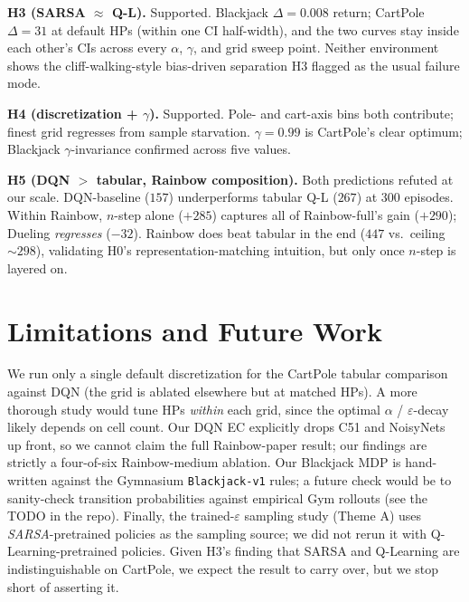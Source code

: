 \documentclass[conference]{IEEEtran}
\begin{document}
\textbf{H3 (SARSA $\approx$ Q-L).} Supported. Blackjack
$\Delta = 0.008$ return; CartPole $\Delta = 31$ at default HPs
(within one CI half-width), and the two curves stay inside each
other's CIs across every $\alpha$, $\gamma$, and grid sweep
point. Neither environment shows the cliff-walking-style
bias-driven separation H3 flagged as the usual failure mode.

\textbf{H4 (discretization + $\gamma$).} Supported. Pole- and
cart-axis bins both contribute; finest grid regresses from
sample starvation. $\gamma = 0.99$ is CartPole's clear
optimum; Blackjack $\gamma$-invariance confirmed across five
values.

\textbf{H5 (DQN $>$ tabular, Rainbow composition).} Both
predictions refuted at our scale. DQN-baseline ($157$)
underperforms tabular Q-L ($267$) at 300 episodes. Within Rainbow,
$n$-step alone ($+285$) captures all of Rainbow-full's gain
($+290$); Dueling \emph{regresses} ($-32$). Rainbow does beat
tabular in the end ($447$ vs.\ ceiling $\sim 298$), validating
H0's representation-matching intuition, but only once $n$-step
is layered on.


\section{Limitations and Future Work}

We run only a single default discretization for the CartPole tabular
comparison against DQN (the grid is ablated elsewhere but at matched
HPs). A more thorough study would tune HPs \emph{within} each grid,
since the optimal $\alpha$ / $\varepsilon$-decay likely depends on
cell count. Our DQN EC explicitly drops C51 and NoisyNets up front, so
we cannot claim the full Rainbow-paper result; our findings are
strictly a four-of-six Rainbow-medium ablation. Our Blackjack MDP is
hand-written against the Gymnasium \texttt{Blackjack-v1} rules; a
future check would be to sanity-check transition probabilities against
empirical Gym rollouts (see the TODO in the repo). Finally, the
trained-$\varepsilon$ sampling study (Theme A) uses
\emph{SARSA}-pretrained policies as the sampling source; we did not
rerun it with Q-Learning-pretrained policies. Given H3's finding that
SARSA and Q-Learning are indistinguishable on CartPole, we expect the
result to carry over, but we stop short of asserting it.


\end{document}

